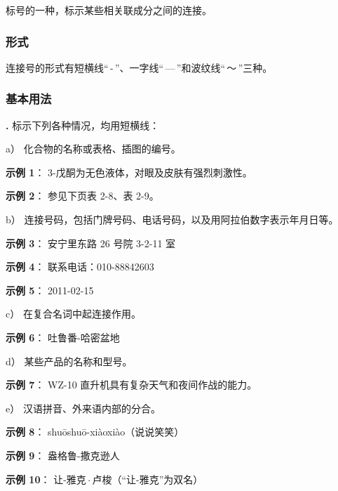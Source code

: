 \documentclass[a4paper]{article}
\newcounter{mycounter}[subsubsection]
\renewcommand{\themycounter}{\textbf{\thesubsubsection.\arabic{mycounter}}}
\begin{document}
标号的一种，标示某些相关联成分之间的连接。

\subsubsection{形式}

连接号的形式有短横线“\,-\,”、一字线“\,—\,”和波纹线“\,～\,”三种。

\subsubsection{基本用法}
\vspace{1em}

\themycounter\hspace{1em}
标示下列各种情况，均用短横线：

a）
化合物的名称或表格、插图的编号。

\hspace{1em}\textbf{示例 1}：
3-戊酮为无色液体，对眼及皮肤有强烈刺激性。

\hspace{1em}\textbf{示例 2}：
参见下页表 2-8、表 2-9。

b）
连接号码，包括门牌号码、电话号码，以及用阿拉伯数字表示年月日等。

\hspace{1em}\textbf{示例 3}：
安宁里东路 26 号院 3-2-11 室

\hspace{1em}\textbf{示例 4}：
联系电话：010-88842603

\hspace{1em}\textbf{示例 5}：
2011-02-15

c）
在复合名词中起连接作用。

\hspace{1em}\textbf{示例 6}：
吐鲁番-哈密盆地

d）
某些产品的名称和型号。

\hspace{1em}\textbf{示例 7}：
WZ-10 直升机具有复杂天气和夜间作战的能力。

e）
汉语拼音、外来语内部的分合。

\hspace{1em}\textbf{示例 8}：
shuōshuō-xiàoxiào（说说笑笑）

\hspace{1em}\textbf{示例 9}：
盎格鲁-撒克逊人

\hspace{1em}\textbf{示例 10}：
让-雅克\,$\cdot$\,卢梭（“让-雅克”为双名）
\end{document}
